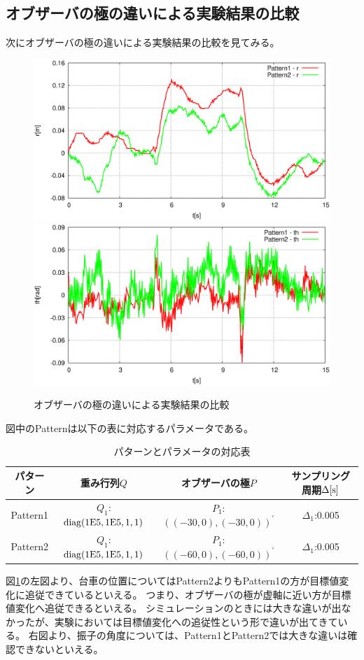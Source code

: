 	\subsection{オブザーバの極の違いによる実験結果の比較}
	次にオブザーバの極の違いによる実験結果の比較を見てみる。
	\begin{figure}[H]
		\centering
		\includegraphics[width=0.49\linewidth]{gazo/Compare_obs_R.eps}
		\includegraphics[width=0.49\linewidth]{gazo/Compare_obs_TH.eps}
		\caption{オブザーバの極の違いによる実験結果の比較}
		\label{image:comp_obs}
	\end{figure}
	図中のPatternは以下の表に対応するパラメータである。
	\begin{table}[H]
		\begin{center}
			\caption{パターンとパラメータの対応表}
			\medskip
			
			\begin{tabular}{|c|c|c|c|}\hline
				パターン & 重み行列$Q$ & オブザーバの極$P$ & サンプリング周期$\Delta[\rm{s}]$ \\ \hline\hline
				Pattern1 & $Q_1$:$\rm{diag}(1E5,1E5,1,1)$ & $P_1$:$((-30,0),(-30,0))^{'}$ & $\Delta_1$:0.005 \\ \hline
				Pattern2 & $Q_1$:$\rm{diag}(1E5,1E5,1,1)$ & $P_1$:$((-60,0),(-60,0))^{'}$ & $\Delta_1$:0.005 \\ \hline
			\end{tabular}
		\end{center}
		\label{table:huriage_control}
	\end{table}
	図\ref{image:comp_obs}の左図より、台車の位置についてはPattern2よりもPattern1の方が目標値変化に追従できているといえる。
	つまり、オブザーバの極が虚軸に近い方が目標値変化へ追従できるといえる。
	シミュレーションのときには大きな違いが出なかったが、実験においては目標値変化への追従性という形で違いが出てきている。
	右図より、振子の角度については、Pattern1とPattern2では大きな違いは確認できないといえる。
	\newpage
